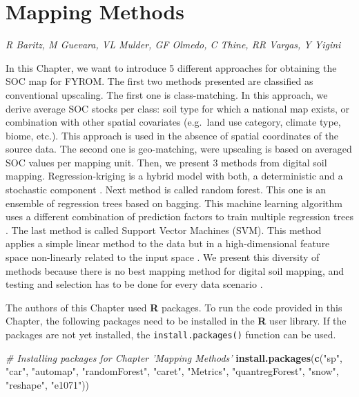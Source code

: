 \documentclass[10pt,b5paper,]{book}
\newenvironment{Shaded}{\begin{snugshade}}{\end{snugshade}}
\newcommand{\CommentTok}[1]{\textcolor[rgb]{0.56,0.35,0.01}{\textit{#1}}}
\newcommand{\KeywordTok}[1]{\textcolor[rgb]{0.13,0.29,0.53}{\textbf{#1}}}
\newcommand{\NormalTok}[1]{#1}
\newcommand{\StringTok}[1]{\textcolor[rgb]{0.31,0.60,0.02}{#1}}
\theoremstyle{definition}
\theoremstyle{definition}
\theoremstyle{definition}
\theoremstyle{remark}
\begin{document}
\hypertarget{mappingMethods}{%
\chapter{Mapping Methods}\label{mappingMethods}}

\emph{R Baritz, M Guevara, VL Mulder, GF Olmedo, C Thine, RR Vargas, Y
Yigini}

In this Chapter, we want to introduce 5 different approaches for
obtaining the SOC map for FYROM. The first two methods presented are
classified as conventional upscaling. The first one is class-matching.
In this approach, we derive average SOC stocks per class: soil type for
which a national map exists, or combination with other spatial
covariates (e.g.~land use category, climate type, biome, etc.). This
approach is used in the absence of spatial coordinates of the source
data. The second one is geo-matching, were upscaling is based on
averaged SOC values per mapping unit. Then, we present 3 methods from
digital soil mapping. Regression-kriging is a hybrid model with both, a
deterministic and a stochastic component \citep{hengl2007regression}.
Next method is called random forest. This one is an ensemble of
regression trees based on bagging. This machine learning algorithm uses
a different combination of prediction factors to train multiple
regression trees \citep{Breiman1996}. The last method is called Support
Vector Machines (SVM). This method applies a simple linear method to the
data but in a high-dimensional feature space non-linearly related to the
input space \citep{Karatzoglou2006}. We present this diversity of
methods because there is no best mapping method for digital soil
mapping, and testing and selection has to be done for every data
scenario \citep{soil-2017-40}.

The authors of this Chapter used \textbf{R} packages. To run the code
provided in this Chapter, the following packages need to be installed in
the \textbf{R} user library. If the packages are not yet installed, the
\texttt{install.packages()} function can be used.

\begin{Shaded}
\begin{Highlighting}[]
\CommentTok{# Installing packages for Chapter 'Mapping Methods'}
\KeywordTok{install.packages}\NormalTok{(}\KeywordTok{c}\NormalTok{(}\StringTok{"sp"}\NormalTok{, }\StringTok{"car"}\NormalTok{, }\StringTok{"automap"}\NormalTok{,}
                   \StringTok{"randomForest"}\NormalTok{, }\StringTok{"caret"}\NormalTok{, }\StringTok{"Metrics"}\NormalTok{,}
                   \StringTok{"quantregForest"}\NormalTok{, }\StringTok{"snow"}\NormalTok{, }\StringTok{"reshape"}\NormalTok{,}
                   \StringTok{"e1071"}\NormalTok{))}
\end{Highlighting}
\end{Shaded}
\end{document}
